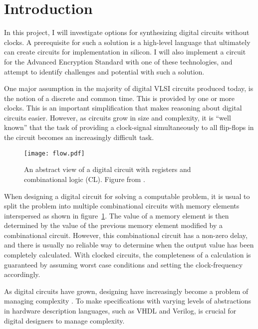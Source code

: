 \section{Introduction}

In this project, I will investigate options for synthesizing digital
circuits without clocks. A prerequisite for such a solution is a
high-level language that ultimately can create circuits for
implementation in silicon. I will also implement a circuit for the
 Advanced Encryption
Standard with one of these technologies, and attempt to identify
challenges and potential with such a solution.

One major assumption in the majority of digital
 VLSI circuits
produced today, is the notion of a discrete and common time. This is
provided by one or more clocks. This is an important simplification
that makes reasoning about digital circuits easier. However, as
circuits grow in size and complexity, it is ``well known''
\cite[pp. 5]{sparso} that the task of providing a clock-signal
simultaneously to all flip-flops in the circuit becomes an
increasingly difficult task.

\begin{figure}[htbp]
  \centering
  \texttt{[image: flow.pdf]}
  \caption{An abstract view of a digital circuit with registers and
    combinational logic (CL). Figure from \cite{sparso}.}
  \label{fig:flow}
\end{figure}

When designing a digital circuit for solving a computable problem, it
is usual to split the problem into multiple combinational circuits
with memory elements interspersed as shown in
figure~\ref{fig:flow}. The value of a memory element is then
determined by the value of the previous memory element modified by a
combinational circuit. However, this combinational circuit has a
non-zero delay, and there is usually no reliable way to determine when
the output value has been completely calculated. With clocked
circuits, the completeness of a calculation is guaranteed by assuming
worst case conditions and setting the clock-frequency accordingly.

As digital circuits have grown, designing have increasingly become a
problem of managing complexity \cite{flynn2009deep}. To make
specifications with varying levels of abstractions in hardware
description languages, such as VHDL and Verilog, is crucial for
digital designers to manage complexity.

